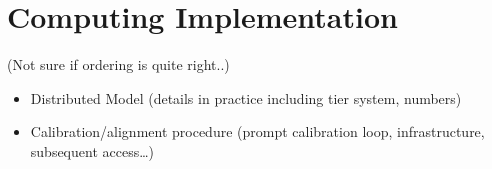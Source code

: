 \section{Computing Implementation} 
(Not sure if ordering is quite right..)


\begin{itemize}

\item Distributed Model (details in practice including tier system, numbers)





\item Calibration/alignment procedure (prompt calibration loop,
  infrastructure, subsequent access\ldots)





\end{itemize}
